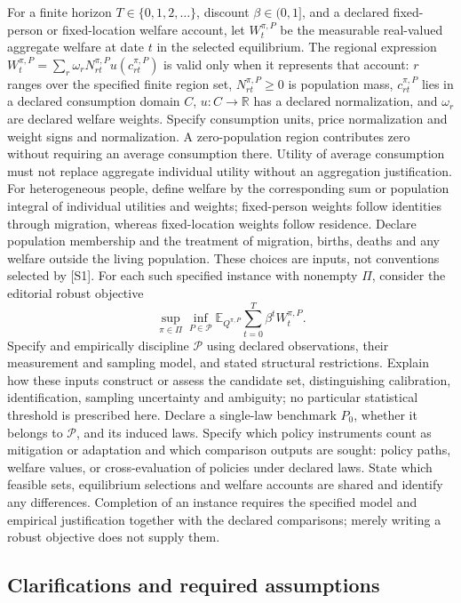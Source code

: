 \documentclass[11pt,a4paper]{article}
\newcommand{\R}{\mathbb R}
\begin{document}
For a finite horizon \(T\in\{0,1,2,\ldots\}\), discount \(\beta\in(0,1]\), and a declared fixed-person or fixed-location welfare account, let \(W_t^{\pi,P}\) be the measurable real-valued aggregate welfare at date \(t\) in the selected equilibrium. The regional expression \(W_t^{\pi,P}=\sum_r\omega_rN_{rt}^{\pi,P}u(c_{rt}^{\pi,P})\) is valid only when it represents that account: \(r\) ranges over the specified finite region set, \(N_{rt}^{\pi,P}\geq0\) is population mass, \(c_{rt}^{\pi,P}\) lies in a declared consumption domain \(C\), \(u:C\to\R\) has a declared normalization, and \(\omega_r\) are declared welfare weights. Specify consumption units, price normalization and weight signs and normalization. A zero-population region contributes zero without requiring an average consumption there. Utility of average consumption must not replace aggregate individual utility without an aggregation justification. For heterogeneous people, define welfare by the corresponding sum or population integral of individual utilities and weights; fixed-person weights follow identities through migration, whereas fixed-location weights follow residence. Declare population membership and the treatment of migration, births, deaths and any welfare outside the living population. These choices are inputs, not conventions selected by [S1]. For each such specified instance with nonempty \(\Pi\), consider the editorial robust objective
\[
 \sup_{\pi\in\Pi}\inf_{P\in\mathcal P}
 \mathbb E_{Q^{\pi,P}}\sum_{t=0}^{T}\beta^t
                W_t^{\pi,P}.
\]
Specify and empirically discipline \(\mathcal P\) using declared observations, their measurement and sampling model, and stated structural restrictions. Explain how these inputs construct or assess the candidate set, distinguishing calibration, identification, sampling uncertainty and ambiguity; no particular statistical threshold is prescribed here. Declare a single-law benchmark \(P_0\), whether it belongs to \(\mathcal P\), and its induced laws. Specify which policy instruments count as mitigation or adaptation and which comparison outputs are sought: policy paths, welfare values, or cross-evaluation of policies under declared laws. State which feasible sets, equilibrium selections and welfare accounts are shared and identify any differences. Completion of an instance requires the specified model and empirical justification together with the declared comparisons; merely writing a robust objective does not supply them.

\subsection*{Clarifications and required assumptions}
\end{document}

